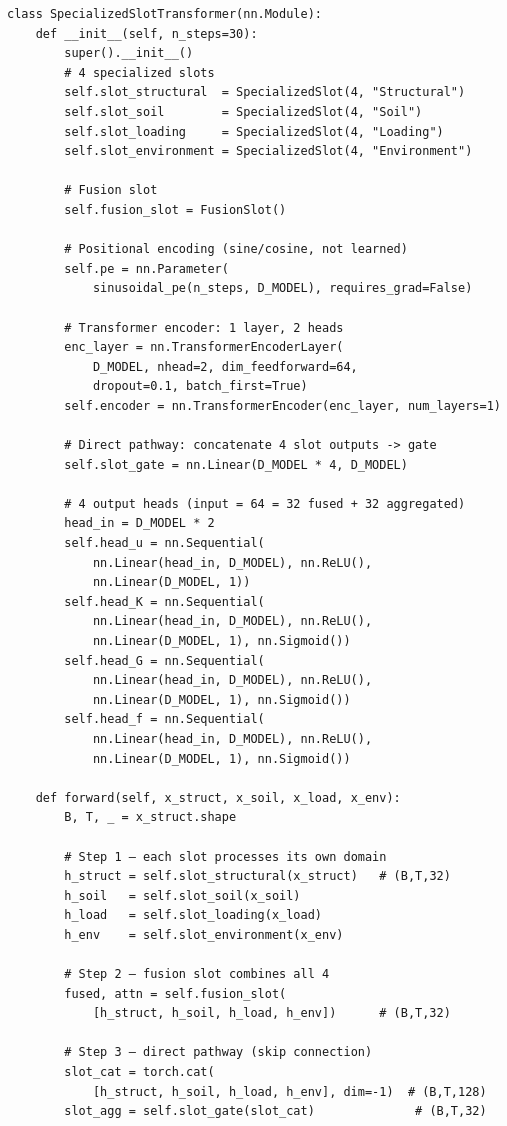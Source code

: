 \documentclass[12pt,a4paper]{article}
\begin{document}
\begin{lstlisting}[caption={SpecializedSlotTransformer — complete forward pass.}]
class SpecializedSlotTransformer(nn.Module):
    def __init__(self, n_steps=30):
        super().__init__()
        # 4 specialized slots
        self.slot_structural  = SpecializedSlot(4, "Structural")
        self.slot_soil        = SpecializedSlot(4, "Soil")
        self.slot_loading     = SpecializedSlot(4, "Loading")
        self.slot_environment = SpecializedSlot(4, "Environment")

        # Fusion slot
        self.fusion_slot = FusionSlot()

        # Positional encoding (sine/cosine, not learned)
        self.pe = nn.Parameter(
            sinusoidal_pe(n_steps, D_MODEL), requires_grad=False)

        # Transformer encoder: 1 layer, 2 heads
        enc_layer = nn.TransformerEncoderLayer(
            D_MODEL, nhead=2, dim_feedforward=64,
            dropout=0.1, batch_first=True)
        self.encoder = nn.TransformerEncoder(enc_layer, num_layers=1)

        # Direct pathway: concatenate 4 slot outputs -> gate
        self.slot_gate = nn.Linear(D_MODEL * 4, D_MODEL)

        # 4 output heads (input = 64 = 32 fused + 32 aggregated)
        head_in = D_MODEL * 2
        self.head_u = nn.Sequential(
            nn.Linear(head_in, D_MODEL), nn.ReLU(),
            nn.Linear(D_MODEL, 1))
        self.head_K = nn.Sequential(
            nn.Linear(head_in, D_MODEL), nn.ReLU(),
            nn.Linear(D_MODEL, 1), nn.Sigmoid())
        self.head_G = nn.Sequential(
            nn.Linear(head_in, D_MODEL), nn.ReLU(),
            nn.Linear(D_MODEL, 1), nn.Sigmoid())
        self.head_f = nn.Sequential(
            nn.Linear(head_in, D_MODEL), nn.ReLU(),
            nn.Linear(D_MODEL, 1), nn.Sigmoid())

    def forward(self, x_struct, x_soil, x_load, x_env):
        B, T, _ = x_struct.shape

        # Step 1 — each slot processes its own domain
        h_struct = self.slot_structural(x_struct)   # (B,T,32)
        h_soil   = self.slot_soil(x_soil)
        h_load   = self.slot_loading(x_load)
        h_env    = self.slot_environment(x_env)

        # Step 2 — fusion slot combines all 4
        fused, attn = self.fusion_slot(
            [h_struct, h_soil, h_load, h_env])      # (B,T,32)

        # Step 3 — direct pathway (skip connection)
        slot_cat = torch.cat(
            [h_struct, h_soil, h_load, h_env], dim=-1)  # (B,T,128)
        slot_agg = self.slot_gate(slot_cat)              # (B,T,32)


\end{lstlisting}
\end{document}
